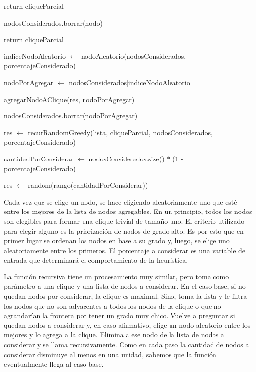 \begin{algorithm}[H]
	\NoCaptionOfAlgo
	\caption{}
	
	{
		return cliqueParcial
	}
	
	{
		{
			nodosConsiderados.borrar(nodo)
		}
	}

	{
		return cliqueParcial
	}
	
	indiceNodoAleatorio $\leftarrow$ nodoAleatorio(nodosConsiderados, porcentajeConsiderado)
	
	nodoPorAgregar $\leftarrow$ nodosConsiderados[indiceNodoAleatorio]
	
	agregarNodoAClique(res, nodoPorAgregar)

	nodosConsiderados.borrar(nodoPorAgregar)
	
	res $\leftarrow$ recurRandomGreedy(lista, cliqueParcial, nodosConsiderados, porcentajeConsiderado)

\end{algorithm}

\begin{algorithm}[H]
	\NoCaptionOfAlgo
	\caption{}
	
		cantidadPorConsiderar $\leftarrow$ nodosConsiderados.size() $*$ (1 - porcentajeConsiderado)
		
		res $\leftarrow$ random(rango(cantidadPorConsiderar))

\end{algorithm}

Cada vez que se elige un nodo, se hace eligiendo aleatoriamente uno que esté entre los mejores de la lista de nodos agregables. En un principio, todos los nodos son elegibles para formar una clique trivial de tamaño uno. El criterio utilizado para elegir alguno es la priorización de nodos de grado alto. Es por esto que en primer lugar se ordenan los nodos en base a su grado y, luego, se elige uno aleatoriamente entre los primeros. El porcentaje a considerar es una variable de entrada que determinará el comportamiento de la heurística.

La función recursiva tiene un procesamiento muy similar, pero toma como parámetro a una clique y una lista de nodos a considerar. En el caso base, si no quedan nodos por considerar, la clique es maximal. Sino, toma la lista y le filtra los nodos que no son adyacentes a todos los nodos de la clique o que no agrandarían la frontera por tener un grado muy chico. Vuelve a preguntar si quedan nodos a considerar y, en caso afirmativo, elige un nodo aleatorio entre los mejores y lo agrega a la clique. Elimina a ese nodo de la lista de nodos a considerar y se llama recursivamente. Como en cada paso la cantidad de nodos a considerar disminuye al menos en una unidad, sabemos que la función eventualmente llega al caso base.

